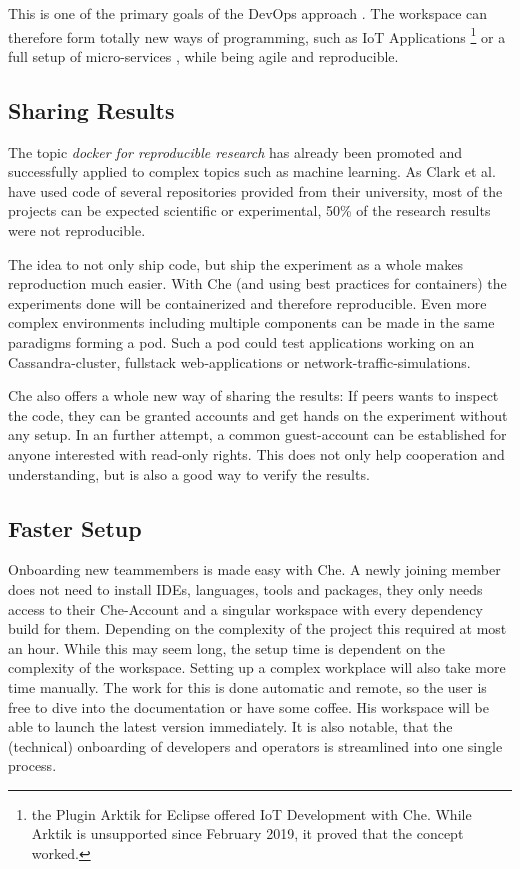 \documentclass[utf8]{lni}
\begin{document}
This is one of the primary goals of the DevOps approach \cite{JA16}. 
The workspace can therefore form totally new ways of programming, such as IoT Applications \footnote{the Plugin Arktik for Eclipse offered IoT Development with Che. While Arktik is unsupported since February 2019, it proved that the concept worked.} or a full setup of micro-services \cite{IV18}, while being agile and reproducible.
\subsection{Sharing Results}
The topic \textit{docker for reproducible research} has already been promoted \cite{BO15} and successfully applied to complex topics \cite{ST16} such as machine learning. 
As Clark et al. \cite{CL14} have used code of several repositories provided from their university, most of the projects can be expected scientific or experimental, 50\% of the research results were not reproducible. 

The idea to not only ship code, but ship the experiment as a whole makes reproduction much easier. 
With Che (and using best practices for containers) the experiments done will be containerized and therefore reproducible. 
Even more complex environments including multiple components can be made in the same paradigms forming a pod. 
Such a pod could test applications working on an Cassandra-cluster, fullstack web-applications or network-traffic-simulations.  

Che also offers a whole new way of sharing the results: 
If peers wants to inspect the code, they can be granted accounts and get hands on the experiment without any setup. 
In an further attempt, a common guest-account can be established for anyone interested with read-only rights. 
This does not only help cooperation and understanding, but is also a good way to verify the results.
\subsection{Faster Setup}
Onboarding new teammembers is made easy with Che. 
A newly joining member does not need to install IDEs, languages, tools and packages, they only needs access to their Che-Account and a singular workspace with every dependency build for them.
Depending on the complexity of the project this required at most an hour. 
While this may seem long, the setup time is dependent on the complexity of the workspace. 
Setting up a complex workplace will also take more time manually. 
The work for this is done automatic and remote, so the user is free to dive into the documentation or have some coffee. 
His workspace will be able to launch the latest version immediately.
It is also notable, that the (technical) onboarding of developers and operators is streamlined into one single process. 
\end{document}
